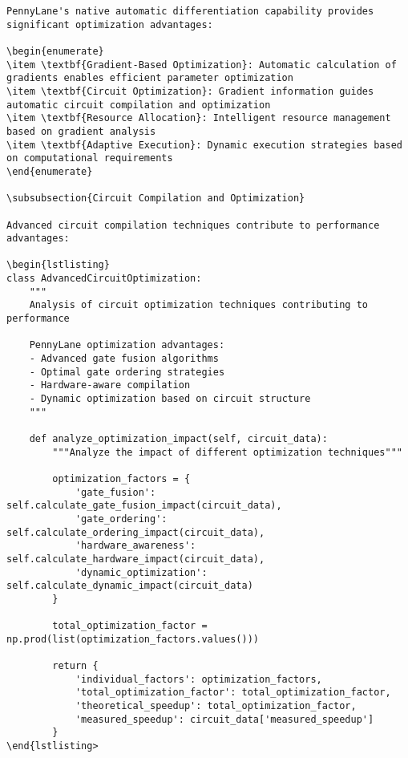 \documentclass[12pt,a4paper]{report}
\begin{document}
\begin{lstlisting}
PennyLane's native automatic differentiation capability provides significant optimization advantages:

\begin{enumerate}
\item \textbf{Gradient-Based Optimization}: Automatic calculation of gradients enables efficient parameter optimization
\item \textbf{Circuit Optimization}: Gradient information guides automatic circuit compilation and optimization
\item \textbf{Resource Allocation}: Intelligent resource management based on gradient analysis
\item \textbf{Adaptive Execution}: Dynamic execution strategies based on computational requirements
\end{enumerate}

\subsubsection{Circuit Compilation and Optimization}

Advanced circuit compilation techniques contribute to performance advantages:

\begin{lstlisting}
class AdvancedCircuitOptimization:
    """
    Analysis of circuit optimization techniques contributing to performance

    PennyLane optimization advantages:
    - Advanced gate fusion algorithms
    - Optimal gate ordering strategies
    - Hardware-aware compilation
    - Dynamic optimization based on circuit structure
    """

    def analyze_optimization_impact(self, circuit_data):
        """Analyze the impact of different optimization techniques"""

        optimization_factors = {
            'gate_fusion': self.calculate_gate_fusion_impact(circuit_data),
            'gate_ordering': self.calculate_ordering_impact(circuit_data),
            'hardware_awareness': self.calculate_hardware_impact(circuit_data),
            'dynamic_optimization': self.calculate_dynamic_impact(circuit_data)
        }

        total_optimization_factor = np.prod(list(optimization_factors.values()))

        return {
            'individual_factors': optimization_factors,
            'total_optimization_factor': total_optimization_factor,
            'theoretical_speedup': total_optimization_factor,
            'measured_speedup': circuit_data['measured_speedup']
        }
\end{lstlisting>


\end{lstlisting}
\end{document}
